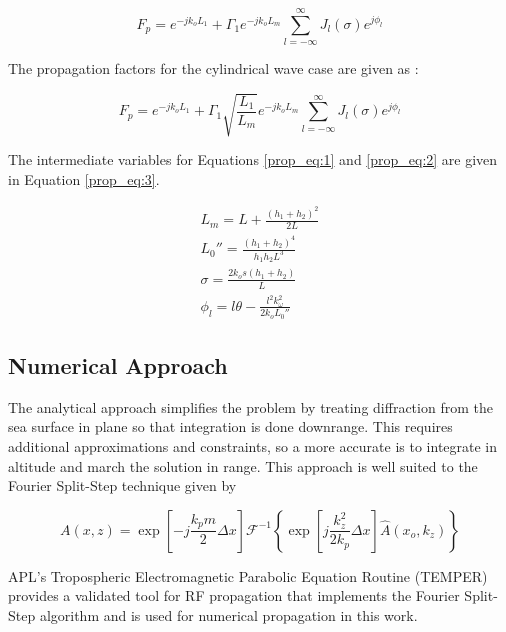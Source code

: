 \begin{equation}
F_p =e^{-jk_oL_1}+\Gamma_1 e^{-jk_oL_m} \sum_{l=-\infty}^{\infty}J_l(\sigma)e^{j\phi_l}
\label{prop_eq:1}
\end{equation}
\renewcommand{\baselinestretch}{2} \small\normalsize

The propagation factors for the cylindrical wave case are given as \cite{frazier_green}:

\begin{equation}
F_p =e^{-jk_oL_1}+\Gamma_1\sqrt{\frac{L_1}{L_m}} e^{-jk_oL_m} \sum_{l=-\infty}^{\infty}J_l(\sigma)e^{j\phi_l}
\label{prop_eq:2}
\end{equation}
\renewcommand{\baselinestretch}{2} \small\normalsize

The intermediate variables for Equations \ref{prop_eq:1} and \ref{prop_eq:2} are given in Equation \ref{prop_eq:3}.

\begin{equation}
\begin{gathered}
L_m = L + \frac{(h_1+h_2)^2}{2L} \\
L_0''=\frac{(h_1+h_2)^4}{h_1h_2L^3} \\
\sigma = \frac{2k_os(h_1+h_2)}{L} \\
\phi_l = l\theta - \frac{l^2k_{\omega}^2}{2k_oL_0''}
\label{prop_eq:3}
\end{gathered}
\end{equation}
\renewcommand{\baselinestretch}{2} \small\normalsize

\subsection{Numerical Approach}
The analytical approach simplifies the problem by treating diffraction from the sea surface in plane so that integration is done downrange. This requires additional approximations and constraints, so a more accurate is to integrate in altitude and march the solution in range. This approach is well suited to the Fourier Split-Step technique given by \cite{frazier_green} 

\begin{equation}
A(x,z) = \exp\left[-j\frac{k_pm}{2}\Delta x\right]\mathcal{F}^{-1}\left\{\exp\left[j\frac{k_z^2}{2k_p}\Delta x \right]\hat{A}(x_o,k_z) \right\}
\label{prop_eq:4}
\end{equation}
\renewcommand{\baselinestretch}{2} \small\normalsize

APL's Tropospheric Electromagnetic Parabolic Equation Routine (TEMPER) \cite{temper_guide} provides a validated tool for RF propagation that implements the Fourier Split-Step algorithm and is used for numerical propagation in this work.


